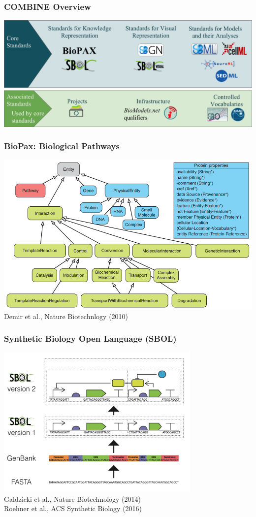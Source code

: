 \documentclass{beamer}
\begin{document}
\begin{frame}\frametitle{COMBINE Overview}
\begin{center}
\includegraphics[width=\textwidth]{figs/COMBINE_Overview3}
\end{center}
\end{frame}

\begin{frame}\frametitle{BioPax: Biological Pathways}
\begin{center}
\includegraphics[width=\textwidth]{figs/BioPax}\\
Demir et al., Nature Biotechnlogy (2010)
\end{center}
\end{frame}

\begin{frame}\frametitle{Synthetic Biology Open Language (SBOL)}
\begin{center}
\includegraphics[width=0.75\textwidth]{figs/SBOL}\\
Galdzicki et al., Nature Biotechnology (2014) \\
Roehner et al., ACS Synthetic Biology (2016)
\end{center}
\end{frame}
\end{document}
